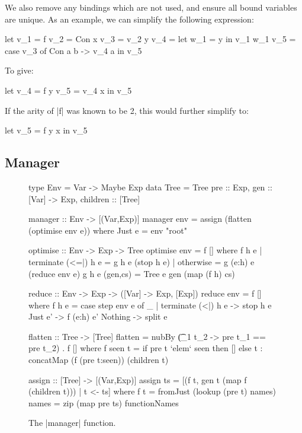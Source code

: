 \documentclass[draft]{sigplanconf}
\begin{document}
We also remove any bindings which are not used, and ensure all bound variables are unique. As an example, we can simplify the following expression:

\begin{code}
let  v_1  = f
     v_2  = Con x
     v_3  = v_2 y
     v_4  = let w_1 = y in v_1 w_1
     v_5  = case v_3 of Con a b -> v_4 a
in   v_5
\end{code}

\noindent To give:

\begin{code}
let  v_4  = f y
     v_5  = v_4 x
in   v_5
\end{code}

\noindent If the arity of |f| was known to be 2, this would further simplify to:

\begin{code}
let  v_5  = f y x
in   v_5
\end{code}

\subsection{Manager}
\label{sec:manager}

\begin{figure}
\begin{code}
type Env = Var -> Maybe Exp
data Tree = Tree
    {pre :: Exp, gen :: [Var] -> Exp, children :: [Tree]}

manager :: Env -> [(Var,Exp)]
manager env = assign (flatten (optimise env e))
    where Just e = env "root"

optimise :: Env -> Exp -> Tree
optimise env = f []
    where  f h e  | terminate (<=|) h e = g h e (stop h e)
                  | otherwise = g (e:h) e (reduce env e)
           g h e (gen,cs) = Tree e gen (map (f h) cs)

reduce :: Env -> Exp -> ([Var] -> Exp, [Exp])
reduce env = f []
    where f h e = case  step env e of
                        _ | terminate (<|) h e -> stop h e
                        Just e'  -> f (e:h) e'
                        Nothing  -> split e

flatten :: Tree -> [Tree]
flatten = nubBy (\t_1 t_2 -> pre t_1 == pre t_2) . f []
    where f seen t  =  if pre t `elem` seen then [] else
                       t : concatMap (f (pre t:seen)) (children t)

assign :: [Tree] -> [(Var,Exp)]
assign ts = [(f t, gen t (map f (children t))) |  t <- ts]
    where  f t = fromJust (lookup (pre t) names)
           names = zip (map pre ts) functionNames
\end{code}
\caption{The |manager| function.}
\label{fig:manager}
\end{figure}
\end{document}

